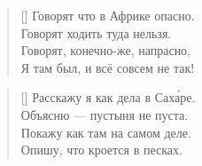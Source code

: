\documentclass[a5paper,11pt]{memoir}
\begin{document}
\hfill
{}
\BgThispage
\newpage


\color{white}
\PlainPoemTitle
{}

\begin{verse}[\versewidth]
Говорят что в Африке опасно. \\
Говорят ходить туда нельзя. \\
Говорят, конечно-же, напрасно, \\
Я там был, и всё совсем не так!
\end{verse}

\begin{verse}[\versewidth]
Расскажу я как дела в Сах\'{а}ре. \\
Объясню --- пустыня не пуста. \\
Покажу как там на самом деле. \\
Опишу, что кроется в песках.
\end{verse}
\end{document}
